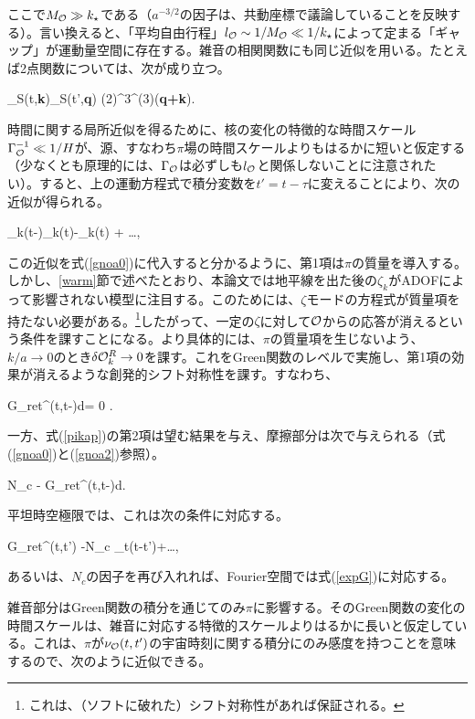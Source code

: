ここで$M_{{\cal O}}\gg k_\star$である（$a^{-3/2}$の因子は、共動座標で議論していることを反映する）。言い換えると、「平均自由行程」$l_{\cal O}\sim1/M_{\cal O}\ll1/k_\star$によって定まる「ギャップ」が運動量空間に存在する。雑音の相関関数にも同じ近似を用いる。たとえば2点関数については、次が成り立つ。

\beq
\label{twop1}
\langle \delta\calo_S(t,{\bf k})\delta\calo_S(t',{\bf q})\rangle \simeq {} (2\pi)^3\delta^{(3)}({\bf q+\bf k}).
\eeq

時間に関する局所近似を得るために、核の変化の特徴的な時間スケール$\Gamma_{\cal O}^{-1}\ll1/H$が、源、すなわち$\pi$場の時間スケールよりもはるかに短いと仮定する（少なくとも原理的には、$\Gamma_{{\cal O}}$は必ずしも$l_{{\cal O}}$と関係しないことに注意されたい）。すると、上の運動方程式で積分変数を$t'=t-\tau$に変えることにより、次の近似が得られる。

\beq
\label{pikap}
 \pi_k(t-\tau)\simeq \pi_k(t)-\dot\pi_k(t) \tau + \ldots,
\eeq

この近似を式(\ref{gnoa0})に代入すると分かるように、第1項は$\pi$の質量を導入する。しかし、\ref{warm}節で述べたとおり、本論文では地平線を出た後の$\zeta_k$がADOFによって影響されない模型に注目する。このためには、$\zeta$モードの方程式が質量項を持たない必要がある。\footnote{これは、（ソフトに破れた）シフト対称性があれば保証される。}したがって、一定の$\zeta$に対して${\cal O}$からの応答が消えるという条件を課すことになる。より具体的には、$\pi$の質量項を生じないよう、$k/a\to0$のとき$\delta{\cal O}^R_k\to0$を課す。これをGreen関数のレベルで実施し、第1項の効果が消えるような創発的シフト対称性を課す。すなわち、

\be
\int {}G_{\rm ret}^\calo(t,t-\tau)d\tau = 0 .
\ee

一方、式(\ref{pikap})の第2項は望む結果を与え、摩擦部分は次で与えられる（式(\ref{gnoa0})と(\ref{gnoa2})参照）。

\beq
\label{gamkap}
N_c \gamma \simeq- \int {}\cdot\tau\cdot G_{\rm ret}^\calo(t,t-\tau)d\tau.
\eeq

平坦時空極限では、これは次の条件に対応する。

\beq
\label{gretto}
G_{\rm ret}^\calo(t,t') \simeq -\gamma N_c \partial_t\delta(t-t')+\ldots,
\eeq

あるいは、$N_c$の因子を再び入れれば、Fourier空間では式(\ref{expG})に対応する。

雑音部分はGreen関数の積分を通じてのみ$\pi$に影響する。そのGreen関数の変化の時間スケールは、雑音に対応する特徴的スケールよりはるかに長いと仮定している。これは、$\pi$が$\nu_{{\cal O}}(t,t')$の宇宙時刻に関する積分にのみ感度を持つことを意味するので、次のように近似できる。

